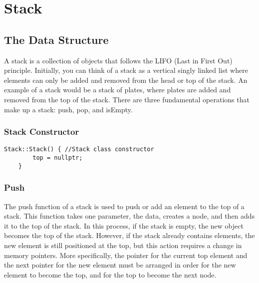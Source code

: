 \documentclass[letterpaper, 10pt,DIV=13]{scrartcl}
\numberwithin{equation}{section} %
\numberwithin{figure}{section} %
\numberwithin{table}{section} %
\begin{document}

\pagebreak

\section{Stack}

\subsection{The Data Structure}
A stack is a collection of objects that follows the LIFO (Last in First Out) principle. Initially, you can think of a stack as a vertical singly linked list where elements can only be added and removed from the head or top of the stack. An example of a stack would be a stack of plates, where plates are added and removed from the top of the stack. There are three fundamental operations that make up a stack: push, pop, and isEmpty.

\subsubsection*{Stack Constructor}
    \lstset{numbers=left, numberstyle=\tiny, stepnumber=1, numbersep=5pt, basicstyle=\footnotesize\ttfamily}
    \begin{lstlisting}[frame=single, ]
    Stack::Stack() { //Stack class constructor
        top = nullptr;
    }

\end{lstlisting}

\subsubsection{Push}
The push function of a stack is used to push or add an element to the top of a stack. This function takes one parameter, the data, creates a node, and then adds it to the top of the stack. In this process, if the stack is empty, the new object becomes the top of the stack. However, if the stack already contains elements, the new element is still positioned at the top, but this action requires a change in memory pointers. More specifically, the pointer for the current top element and the next pointer for the new element must be arranged in order for the new element to become the top, and for the top to become the next node. 
\end{document}
